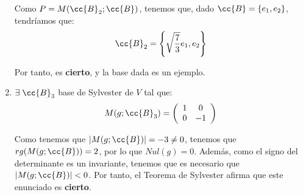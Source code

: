 \documentclass[12pt]{article}
\begin{document}
\begin{ejercicio}
\begin{enumerate}
    Como $P=M(\cc{B}_2;\cc{B})$, tenemos que, dado $\cc{B}=\{e_1, e_2\}$, tendríamos que:
    \begin{equation*}
        \cc{B}_2 = \left\{\sqrt{\frac{7}{3}}e_1, e_2\right\}
    \end{equation*}

    Por tanto, es \textbf{cierto}, y la base dada es un ejemplo.

    \item $\exists\; \cc{B}_3$ base de Sylvester de $V$ tal que:
    \begin{equation*}
        M(g;\cc{B}_3)=\left(\begin{array}{cc}
                1 & 0 \\
                0 & -1 \\
            \end{array}\right)
    \end{equation*}

    Como tenemos que $|M(g;\cc{B})|=-3\neq 0$, tenemos que $rg(M(g;\cc{B}))=2$, por lo que $Nul(g)=0$. Además, como el signo del determinante es un invariante, tenemos que es necesario que $|M(g;\cc{B})|<0$. Por tanto, el Teorema de Sylvester afirma que este enunciado es \textbf{cierto}.
\end{enumerate}
    
\end{ejercicio}
\end{document}
